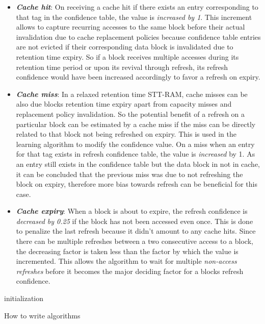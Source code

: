 \documentclass[sigconf]{acmart}
\begin{document}
\begin{itemize}
    \item \textit{\textbf{Cache hit}}: On receiving a cache hit if there exists an entry corresponding to that tag in the confidence table, the value is \textit{increased by 1}. This increment allows to capture recurring accesses to the same block before their actual invalidation due to cache replacement policies because confidence table entries are not evicted if their corresponding data block is invalidated due to retention time expiry. So if a block receives multiple accesses during its retention time period or upon its revival through refresh, its refresh confidence would have been increased accordingly to favor a refresh on expiry.

    \item \textit{\textbf{Cache miss}}: In a relaxed retention time STT-RAM, cache misses can be also due blocks retention time expiry apart from capacity misses and replacement policy invalidation. So the potential benefit of a refresh on a particular block can be estimated by a cache miss if the miss can be directly related to that block not being refreshed on expiry. This is used in the learning algorithm to modify the confidence value. On a miss when an entry for that tag exists in refresh confidence table, the value is \textit{increased} by 1. As an entry still exists in the confidence table but the data block in not in cache, it can be concluded that the previous miss was due to not refreshing the block on expiry, therefore more bias towards refresh can be beneficial for this case.
    
    \item \textit{\textbf{Cache expiry}}: When a block is about to expire, the refresh confidence is \textit{decreased by 0.25} if the block has not been accessed even once. This is done to penalize the last refresh because it didn't amount to any cache hits. Since there can be multiple refreshes between a two consecutive access to a block, the decreasing factor is taken less than the factor by which the value is incremented. This allows the algorithm to wait for multiple \textit{non-access refreshes} before it becomes the major deciding factor for a blocks refresh confidence.
\end{itemize}

\begin{algorithm}[tp]
\SetAlgoLined
 initialization\;
 \caption{How to write algorithms}
\end{algorithm}
\end{document}
